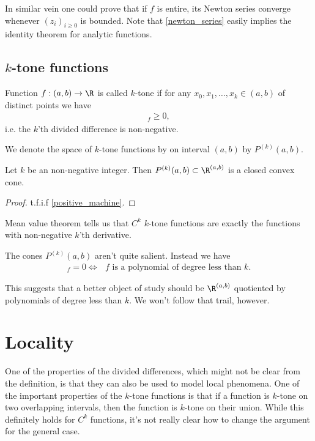 In similar vein one could prove that if $f$ is entire, its Newton series converge whenever $(z_{i})_{i \geq 0}$ is bounded. Note that \ref{newton_series} easily implies the identity theorem for analytic functions.


\subsection{$k$-tone functions}

\begin{maar}
	Function $f : (a, b) \to \R$ is called $k$-tone if for any $x_{0}, x_{1}, \ldots, x_{k} \in (a, b)$ of distinct points we have
	\begin{align*}
		[x_{0}, x_{1}, \ldots, x_{k}]_{f} \geq 0,
	\end{align*}
	i.e. the $k$'th divided difference is non-negative.
\end{maar}

We denote the space of $k$-tone functions by on interval $(a, b)$ by $P^{(k)}(a, b)$.

\begin{lause}
	Let $k$ be an non-negative integer. Then $P^{(k)}(a, b) \subset \R^{(a, b)}$ is a closed convex cone.
\end{lause}
\begin{proof}
	t.f.i.f \ref{positive_machine}.
\end{proof}

Mean value theorem tells us that $C^{k}$ $k$-tone functions are exactly the functions with non-negative $k$'th derivative.

The cones $P^{(k)}(a, b)$ aren't quite salient. Instead we have
\begin{align*}
	[\cdot, \cdot, \ldots, \cdot]_{f} = 0 \Leftrightarrow \text{ $f$ is a polynomial of degree less than $k$}.
\end{align*}

This suggests that a better object of study should be $\R^{(a, b)}$ quotiented by polynomials of degree less than $k$. We won't follow that trail, however.

\section{Locality}

One of the properties of the divided differences, which might not be clear from the definition, is that they can also be used to model local phenomena. One of the important properties of the $k$-tone functions is that if a function is $k$-tone on two overlapping intervals, then the function is $k$-tone on their union. While this definitely holds for $C^{k}$ functions, it's not really clear how to change the argument for the general case.

